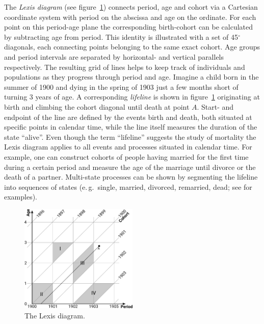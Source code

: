 \documentclass[parskip=half]{scrartcl}
\begin{document}
The \emph{Lexis diagram} (see figure~\ref{fig:lexis}) connects period, age and cohort via a Cartesian coordinate system with period on the abscissa and age on the ordinate. For each point on this period-age plane the corresponding birth-cohort can be calculated by subtracting age from period. This identity is illustrated with a set of 45$^\circ$ diagonals, each connecting points belonging to the same exact cohort. Age groups and period intervals are separated by horizontal- and vertical parallels respectively. The resulting grid of lines helps to keep track of individuals and populations as they progress through period and age. Imagine a child born in the summer of 1900 and dying in the spring of 1903 just a few months short of turning 3 years of age. A corresponding \emph{lifeline} is shown in figure~\ref{fig:lexis} originating at birth and climbing the cohort diagonal until death at point $A$. Start- and endpoint of the line are defined by the events birth and death, both situated at specific points in calendar time, while the line itself measures the duration of the state \enquote{alive}. Even though the term \enquote{lifeline} suggests the study of mortality the Lexis diagram applies to all events and processes situated in calendar time. For example, one can construct cohorts of people having married for the first time during a certain period and measure the age of the marriage until divorce or the death of a partner. Multi-state processes can be shown by segmenting the lifeline into sequences of states (e.\,g.~single, married, divorced, remarried, dead; see \textcite{Willekens2014} for examples).

\begin{figure}[!htb]
  \centering
  \includegraphics[width = 0.5\textwidth]{./fig/lexis_grid.pdf}
  \caption{The Lexis diagram.}
  \label{fig:lexis}
\end{figure}
\end{document}
